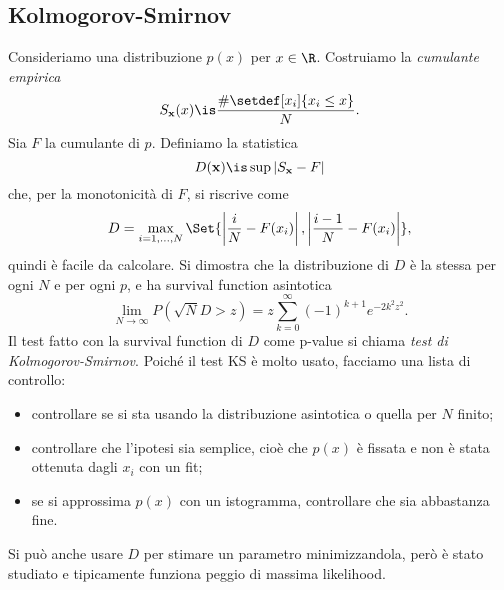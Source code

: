 \subsection{Kolmogorov-Smirnov}

Consideriamo una distribuzione $p(x)$ per $x\in\R$.
Costruiamo la \emph{cumulante empirica} 
\begin{equation*}
	S_{\mathbf x}(x)
	\is \frac {\#\setdef[x_i]{x_i\le x}} N.
\end{equation*}
Sia $F$ la cumulante di $p$.
Definiamo la statistica
\begin{equation*}
	D(\mathbf x)
	\is \sup|S_\mathbf x-F|
\end{equation*}
che, per la monotonicità di $F$, si riscrive come
\begin{equation*}
	D = \max_{i=1,\dotsc,N} \Set{\left|\frac iN-F(x_i)\right|, \left|\frac{i-1}N-F(x_i)\right|},
\end{equation*}
quindi è facile da calcolare.
Si dimostra che la distribuzione di $D$ è la stessa per ogni $N$ e per ogni $p$,
e ha survival function asintotica
\begin{equation*}
	\lim_{N\to\infty} P(\sqrt N D>z)
	= z \sum_{k=0}^\infty (-1)^{k+1} e^{-2k^2z^2}.
\end{equation*}
Il test fatto con la survival function di $D$ come p-value si chiama \emph{test di Kolmogorov-Smirnov}.
Poiché il test KS è molto usato,
facciamo una lista di controllo:
\begin{itemize}
	\item controllare se si sta usando la distribuzione asintotica o quella per $N$ finito;
	\item controllare che l'ipotesi sia semplice,
	cioè che $p(x)$ è fissata e non è stata ottenuta dagli $x_i$ con un fit;
	\item se si approssima $p(x)$ con un istogramma, controllare che sia abbastanza fine.
\end{itemize}
Si può anche usare $D$ per stimare un parametro minimizzandola,
però è stato studiato e tipicamente funziona peggio di massima likelihood.

